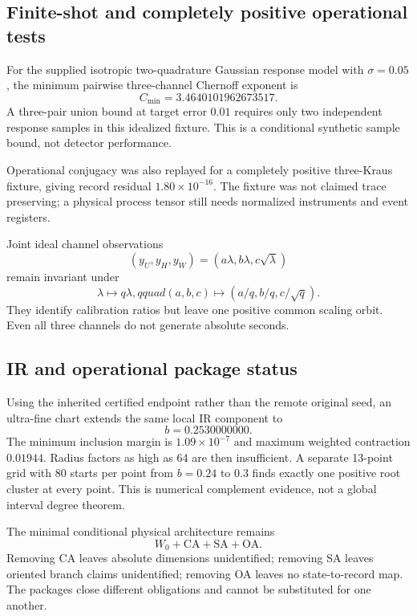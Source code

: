 \documentclass[11pt,a4paper]{article}
\theoremstyle{definition}\newtheorem{definition}[theorem]{Definition}
\theoremstyle{remark}\newtheorem{remark}[theorem]{Remark}
\begin{document}
\subsection{Finite-shot and completely positive operational tests}

For the supplied isotropic two-quadrature Gaussian response model with $\sigma=0.05$, the minimum pairwise three-channel Chernoff exponent is
\[
C_{\min}=3.4640101962673517.
\]
A three-pair union bound at target error $0.01$ requires only two independent response samples in this idealized fixture. This is a conditional synthetic sample bound, not detector performance.

Operational conjugacy was also replayed for a completely positive three-Kraus fixture, giving record residual $1.80\times10^{-16}$. The fixture was not claimed trace preserving; a physical process tensor still needs normalized instruments and event registers.

Joint ideal channel observations
\[
(y_U,y_H,y_W)=(a\lambda,b\lambda,c\sqrt\lambda)
\]
remain invariant under
\[
\lambda\mapsto q\lambda,qquad(a,b,c)\mapsto(a/q,b/q,c/\sqrt q).
\]
They identify calibration ratios but leave one positive common scaling orbit. Even all three channels do not generate absolute seconds.

\subsection{IR and operational package status}

Using the inherited certified endpoint rather than the remote original seed, an ultra-fine chart extends the same local IR component to
\[
\boxed{b=0.2530000000}.
\]
The minimum inclusion margin is $1.09\times10^{-7}$ and maximum weighted contraction $0.01944$. Radius factors as high as 64 are then insufficient. A separate 13-point grid with 80 starts per point from $b=0.24$ to $0.3$ finds exactly one positive root cluster at every point. This is numerical complement evidence, not a global interval degree theorem.

The minimal conditional physical architecture remains
\[
W_0+\mathrm{CA}+\mathrm{SA}+\mathrm{OA}.
\]
Removing CA leaves absolute dimensions unidentified; removing SA leaves oriented branch claims unidentified; removing OA leaves no state-to-record map. The packages close different obligations and cannot be substituted for one another.
\end{document}
